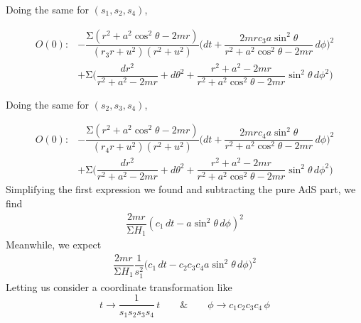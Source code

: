 \begin{ex}
Doing the same for $(s_1,s_2,s_4)$,

\[\begin{align*}
	O(0):&-\dfrac{\mathrm{\Sigma} (r^2+a^2\cos ^2\theta -2mr)}{(r_3r+u^2)(r^2+u^2)}\Big(dt+\dfrac{2mrc_3a\sin ^2\theta}{r^2+a^2\cos ^2\theta -2mr}\,d\phi \Big)^2\\
	&+\mathrm{\Sigma} \Big(\dfrac{dr^2}{r^2+a^2-2mr}+d\theta ^2+\dfrac{r^2+a^2-2mr}{r^2+a^2\cos ^2\theta -2mr}\sin ^2\theta \,d\phi ^2\Big)
\end{align*}\]

Doing the same for $(s_2,s_3,s_4)$,

\[\begin{align*}
	O(0):&-\dfrac{\mathrm{\Sigma} (r^2+a^2\cos ^2\theta -2mr)}{(r_4r+u^2)(r^2+u^2)}\Big(dt+\dfrac{2mrc_4a\sin ^2\theta}{r^2+a^2\cos ^2\theta -2mr}\,d\phi \Big)^2\\
	&+\mathrm{\Sigma} \Big(\dfrac{dr^2}{r^2+a^2-2mr}+d\theta ^2+\dfrac{r^2+a^2-2mr}{r^2+a^2\cos ^2\theta -2mr}\sin ^2\theta \,d\phi ^2\Big)
\end{align*}\]
Simplifying the first expression we found and subtracting the pure AdS part, we find
\[\begin{align*}
	\dfrac{2mr}{\mathrm{\Sigma} H_1}(c_1\,dt-a\sin ^2\theta \,d\phi )^2
\end{align*}\]
Meanwhile, we expect
\[\begin{align*}
\dfrac{2mr}{\mathrm{\Sigma} H_1}\dfrac{1}{s_1^2}\Big(c_1\,dt-c_2c_3c_4a\sin ^2\theta \,d\phi \Big)^2
\end{align*}\]
Letting us consider a coordinate transformation like
\[t\rightarrow \dfrac{1}{s_1s_2s_3s_4}\,t\qquad \& \qquad \phi \rightarrow c_1c_2c_3c_4\,\phi \]

\end{ex}
\vspace{2ex}



